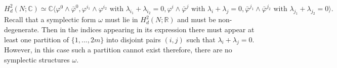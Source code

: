 \documentclass[a4paper, 11pt]{amsart}
\theoremstyle{plain}
\theoremstyle{definition}
\newcommand{\C}{\mathbb{C}}
\numberwithin{equation}{section}
\begin{document}
\begin{Proof}
\begin{equation}
    H^{2}_{d}(N;\C) \simeq \mathbb{C}\langle \varphi^{0} \wedge \bar\varphi^{0}, \varphi^{i_{1}} \wedge \varphi^{i_{2}} \text{ with } \lambda_{i_{1}} + \lambda_{i_{2}} = 0, \varphi^{i} \wedge \bar\varphi^{j} \text{ with } \lambda_{i} + \lambda_{j} = 0, \bar\varphi^{j_{1}} \wedge \bar\varphi^{j_{2}} \text{ with } \lambda_{j_{1}} + \lambda_{j_{2}} = 0 \rangle. 
\end{equation}
Recall that a symplectic form $\omega$ must lie in $H^{2}_d(N;\mathbb{R})$ and must be non-degenerate. Then in the indices appearing in its expression there must appear at least one partition of $\{1,..., 2m\}$ into disjoint pairs $(i,j)$ such that $\lambda_i + \lambda_j = 0$. However, in this case such a partition cannot exist therefore, there are no symplectic structures $\omega$.\\[5pt]

\end{Proof}
\end{document}
